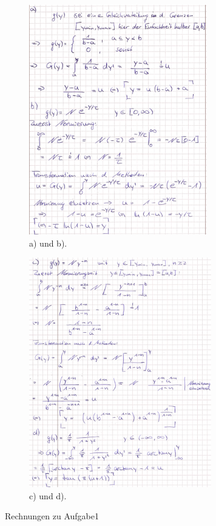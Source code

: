 \begin{figure}
\begin{subfigure}{.48\textwidth}
  \centering
  \includegraphics[height = 10cm]{pics/A1ab}
  \caption{a) und b).}
  \label{fig:A1ab}
\end{subfigure}
\begin{subfigure}{.48\textwidth}
  \centering
  \includegraphics[height = 10cm]{pics/A1cd}
  \caption{c) und d).}
  \label{fig:A1cd}
\end{subfigure}
  \caption{Rechnungen zu Aufgabe1}
  \label{fig:A1rech}
\end{figure}

